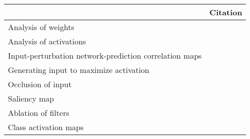 \begin{tabular}{ll}
\toprule
{} &                                                                                                                                                                                          Citation \\
\midrule
Analysis of weights                                    &  \cite{Perez-Benitez2018, Yoon2018, Langkvist2018, Deiss2018, Lawhern2018, Xu2016, Tsinalis2016a, Nurse2016, Tabar2016a, Zheng2015, Stober2015, Manor2015, Yang2015a, Langkvist2012, Cecotti2011} \\
Analysis of activations                                &                                                                                           \cite{Yuan2018a, Waytowich2018, Lawhern2018, kwak2017, Yin2017a, Supratak2017, Shamwell2016, Manor2015} \\
Input-perturbation network-prediction correlation maps &                                                                                                              \cite{Schirrmeister2017a, Volker2018, Hartmann2018b, Behncke2017, Schirrmeister2017} \\
Generating input to maximize activation                &                                                                                                                                      \cite{VanPutten2018b, Ruffini2018a, Sors2018, Bashivan2016a} \\
Occlusion of input                                     &                                                                                                                                                        \cite{Lee2018, Chambon2018, Thodoroff2016} \\
Saliency map                                           &                                                                                                                                                                               \cite{Vilamala2017} \\
Ablation of filters                                    &                                                                                                                                                                                \cite{Lawhern2018} \\
Class activation maps                                  &                                                                                                                                                                                  \cite{Ghosh2018} \\

\end{tabular}
